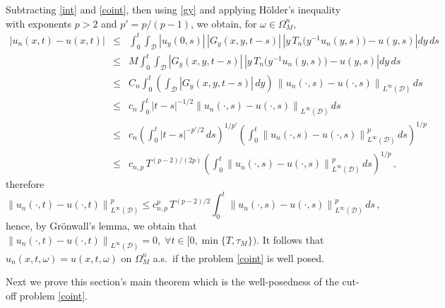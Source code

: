\documentclass[reqno]{amsart}
\numberwithin{equation}{section}
\begin{document}
Subtracting \eqref{int} and \eqref{coint}, then using \eqref{gy} and applying H\"older's inequality with exponents $p>2$ and $ p'=p/(p-1)$, we obtain, for $ \omega\in\Omega_M^n, $
\begin{eqnarray*}
\left|u_n(x,t)-u(x,t)\right|&\leq&
\int_0^t\int_{\mathcal D} |u_y(0,s)| \, |G_y(x,y,t-s)| \, \left|y\, T_n \bigl(y^{-1}u_n(y,s)\bigr)-u(y,s)\right| dy\,ds
\\
&\leq&
M  \int_0^t\int_{\mathcal D} |G_y(x,y,t-s)| \, \left|y\, T_n \bigl(y^{-1}u_n(y,s)\bigr)-u(y,s)\right| dy\,ds
\\
&\leq&
C_n\int_0^t \left(\int_{\mathcal D} |G_y(x,y,t-s)| \, dy\right)\, \left\|u_n(\cdot,s)-u(\cdot,s)\right\|_{L^\infty(\mathcal D)}\,ds
\\
&\leq&
c_n \int_0^t |t-s|^{-1/2} \left\|u_n(\cdot,s)-u(\cdot,s)\right\|_{L^\infty(\mathcal D)}\,ds
\\
&\leq&
c_n 
\left(\int_0^t |t-s|^{-p'/2}\,ds\right)^{1/p'}
\left(\int_0^t \left\|u_n(\cdot,s)-u(\cdot,s)\right\|^p_{L^\infty(\mathcal D)}\,ds\right)^{1/p}
\\
&\leq&
c_{n,p}\,T^{(p-2)/(2p)}\left(\int_0^t \left\|u_n(\cdot,s)-u(\cdot,s)\right\|^p_{L^\infty(\mathcal D)}\,ds\right)^{1/p}\,,
\end{eqnarray*}
therefore
$$\left\|u_n(\cdot,t)-u(\cdot,t)\right\|_{L^\infty(\mathcal D)}^p
\leq 
c^p_{n,p}\,T^{(p-2)/2} \int_0^t \left\|u_n(\cdot,s)-u(\cdot,s)\right\|^p_{L^\infty(\mathcal D)}\,ds \,, $$
hence, by Gr\"onwall's lemma, we obtain that $\left\|u_n(\cdot,t)-u(\cdot,t)\right\|_{L^\infty(\mathcal D)}=0,\; \forall t \in [0,\min\{T,\tau_M\}). $ It follows that $u_n(x,t,\omega)=u(x,t,\omega)$ on $\Omega_M^n$ a.s.\ if the problem \eqref{coint} is well posed.

Next we prove this section's main theorem which is the well-posedness of the cut-off problem \eqref{coint}.
\end{document}

